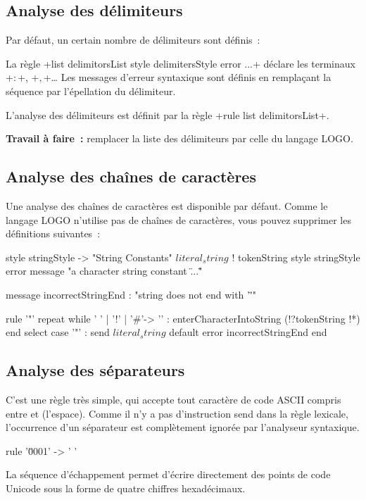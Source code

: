 \subsection{Analyse des délimiteurs}
Par défaut, un certain nombre de délimiteurs sont définis~:


La règle \ggsq+list delimitorsList style delimitersStyle error ...+ déclare les terminaux \ggsq+$:$+, \ggsq+$,$+… Les messages d'erreur syntaxique sont définis en remplaçant la séquence  par l’épellation du délimiteur.

L'analyse des délimiteurs est définit par la règle \ggsq+rule list delimitorsList+.

\textbf{Travail à faire~:} remplacer la liste des délimiteurs par celle du langage LOGO.

\subsection{Analyse des chaînes de caractères}
Une analyse des chaînes de caractères est disponible par défaut. Comme le langage LOGO n’utilise pas de chaînes de caractères, vous pouvez supprimer les définitions suivantes~:

\begin{galgas4}
style stringStyle -> "String Constants"
$literal_string$ ! tokenString style stringStyle %
                   error message "a character string constant \"...\""

message incorrectStringEnd : "string does not end with '\"'"

rule '"' {
  repeat
  while ' ' | '!' | '#'-> '\uFFFD' :
    enterCharacterIntoString (!?tokenString !*)
  end
  select
  case '"' :
    send $literal_string$
  default
    error incorrectStringEnd
  end
}
\end{galgas4}

\subsection{Analyse des séparateurs}
C'est une règle très simple, qui accepte tout caractère de code ASCII compris entre  et  (l'espace). Comme il n'y a pas d'instruction send dans la règle lexicale, l'occurrence d'un séparateur est complètement ignorée par l'analyseur syntaxique.
\begin{galgas4}
rule '\u0001' -> ' ' {
}
\end{galgas4}
La séquence d'échappement  permet d'écrire directement des points de code Unicode sous la forme de quatre chiffres hexadécimaux.

